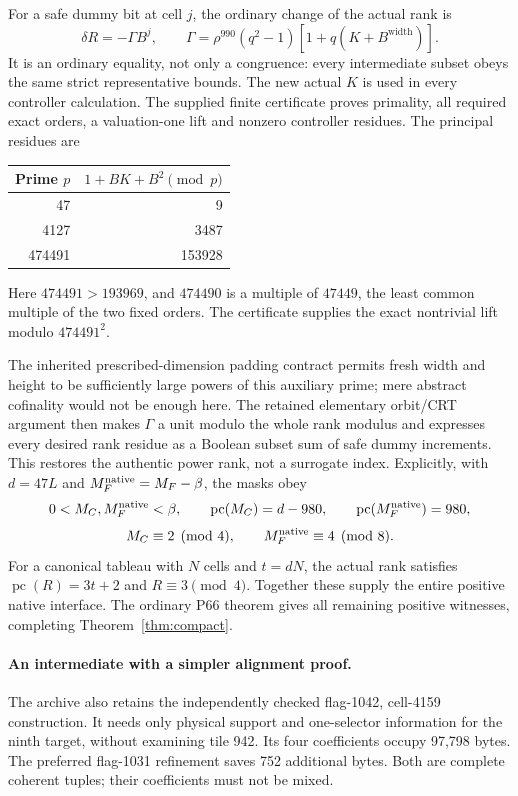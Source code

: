 \documentclass[10pt,letterpaper]{article}
\newcommand{\pc}{\operatorname{pc}}
\theoremstyle{remark}\newtheorem{remark}[theorem]{Remark}
\begin{document}
For a safe dummy bit at cell $j$, the ordinary change of the actual rank is
\[
 \delta R=-\Gamma B^j,\qquad
 \Gamma=\rho^{990}(q^2-1)[1+q(K+B^{\mathrm{width}})].
\]
It is an ordinary equality, not only a congruence: every intermediate
subset obeys the same strict representative bounds. The new actual
$K$ is used in every controller calculation. The supplied finite
certificate proves primality, all required exact orders, a valuation-one
lift and nonzero controller residues. The principal residues are
\begin{center}
\begin{tabular}{rr}
\toprule
Prime $p$ & $1+BK+B^2\pmod p$\\\midrule
47&9\\4127&3487\\474491&153928\\\bottomrule
\end{tabular}
\end{center}
Here $474491>193969$, and $474490$ is a multiple of $47449$, the least
common multiple of the two fixed orders. The certificate supplies the
exact nontrivial lift modulo $474491^2$.

The inherited prescribed-dimension padding contract permits fresh width
and height to be sufficiently large powers of this auxiliary prime;
mere abstract cofinality would not be enough here.
The retained elementary orbit/CRT argument then makes
$\Gamma$ a unit modulo the whole rank modulus and expresses every desired
rank residue as a Boolean subset sum of safe dummy increments. This
restores the authentic power rank, not a surrogate index. Explicitly, with
$d=47L$ and $M_F^{\rm native}=M_F-\beta$, the masks obey
\[
 0<M_C,M_F^{\rm native}<\beta,\qquad
 \pc(M_C)=d-980,\qquad\pc(M_F^{\rm native})=980,
\]
\[
 M_C\equiv2\pmod4,\qquad M_F^{\rm native}\equiv4\pmod8.
\]
For a canonical tableau with $N$ cells and $t=dN$, the actual rank satisfies
$\pc(R)=3t+2$ and $R\equiv3\pmod4$.
Together these supply the entire positive native interface.
The ordinary P66 theorem gives all
remaining positive witnesses, completing Theorem~\ref{thm:compact}.

\paragraph{An intermediate with a simpler alignment proof.}
The archive also retains the independently checked flag-1042, cell-4159
construction. It needs only physical support and one-selector information
for the ninth target, without examining tile 942. Its four coefficients
occupy 97,798 bytes. The preferred flag-1031 refinement saves 752 additional
bytes. Both are complete coherent tuples; their coefficients must not be mixed.
\end{document}
